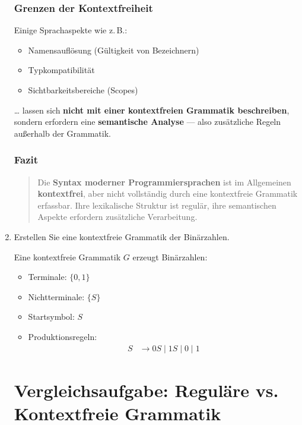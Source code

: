 \documentclass[a4paper,12pt]{article}
\begin{document}
\begin{enumerate}
			\subsubsection*{Grenzen der Kontextfreiheit}
			
			Einige Sprachaspekte wie z.\,B.:
			\begin{itemize}
				\item Namensauflösung (Gültigkeit von Bezeichnern)
				\item Typkompatibilität
				\item Sichtbarkeitsbereiche (Scopes)
			\end{itemize}
			
			… lassen sich \textbf{nicht mit einer kontextfreien Grammatik beschreiben}, sondern erfordern eine \textbf{semantische Analyse} — also zusätzliche Regeln außerhalb der Grammatik.
			
			\subsubsection*{Fazit}
			
			\begin{quote}
				Die \textbf{Syntax moderner Programmiersprachen} ist im Allgemeinen \textbf{kontextfrei}, aber nicht vollständig durch eine kontextfreie Grammatik erfassbar. Ihre lexikalische Struktur ist regulär, ihre semantischen Aspekte erfordern zusätzliche Verarbeitung.
			\end{quote}
			
			\item Erstellen Sie eine kontextfreie Grammatik der Binärzahlen.
			
			Eine kontextfreie Grammatik \( G \) erzeugt Binärzahlen:
			\begin{itemize}
				\item Terminale: \( \{0, 1\} \)
				\item Nichtterminale: \( \{S\} \)
				\item Startsymbol: \( S \)
				\item Produktionsregeln:
				\begin{align*}
					S &\to 0S \mid 1S \mid 0 \mid 1
				\end{align*}
			\end{itemize}
			
			\section*{Vergleichsaufgabe: Reguläre vs. Kontextfreie Grammatik}
			

\end{enumerate}
\end{document}
